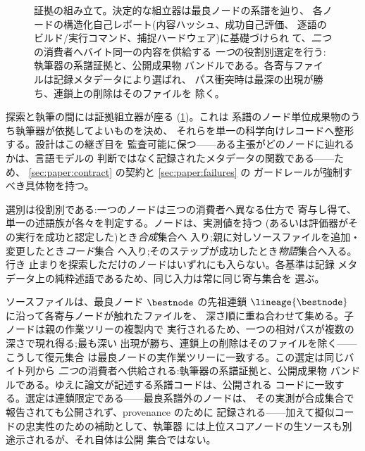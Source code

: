 \begin{figure}[t]
  \centering
  \resizebox{\columnwidth}{!}{}
  \caption{証拠の組み立て。決定的な組立器は最良ノードの系譜を辿り、
           各ノードの構造化自己レポート(内容ハッシュ、成功自己評価、
           逐語のビルド/実行コマンド、捕捉ハードウェア)に基礎づけられ
           て、\emph{二つ}の消費者へバイト同一の内容を供給する\emph{
           一つ}の役割別選定を行う:執筆器の系譜証拠と、公開成果物
           バンドルである。各寄与ファイルは記録メタデータにより選ばれ、
           パス衝突時は最深の出現が勝ち、連鎖上の削除はそのファイルを
           除く。}
  \label{fig:evidence}
\end{figure}

探索と執筆の間には証拠組立器が座る (\cref{fig:evidence})。これは
系譜のノード単位成果物のうち執筆器が依拠してよいものを決め、
それらを単一の科学向けレコードへ整形する。設計はこの継ぎ目を
監査可能に保つ——ある主張がどのノードに辿れるかは、言語モデルの
判断ではなく記録されたメタデータの関数である——ため、
\cref{sec:paper:contract} の契約と \cref{sec:paper:failures} の
ガードレールが強制すべき具体物を持つ。

選別は役割別である:一つのノードは三つの消費者へ異なる仕方で
寄与し得て、単一の述語族が各々を判定する。ノードは、実測値を持つ
(あるいは評価器がその実行を成功と認定した)とき\emph{合成}集合へ
入り;親に対しソースファイルを追加・変更したとき\emph{コード}集合
へ入り;そのステップが成功したとき\emph{物語}集合へ入る。行き
止まりを探索しただけのノードはいずれにも入らない。各基準は記録
メタデータ上の純粋述語であるため、同じ入力は常に同じ寄与集合を
選ぶ。

ソースファイルは、最良ノード $\bestnode$ の先祖連鎖
$\lineage{\bestnode}$ に沿って各寄与ノードが触れたファイルを、
深さ順に重ね合わせて集める。子ノードは親の作業ツリーの複製内で
実行されるため、一つの相対パスが複数の深さで現れ得る;最も深い
出現が勝ち、連鎖上の削除はそのファイルを除く——こうして復元集合
は最良ノードの実作業ツリーに一致する。この選定は同じバイト列から
\emph{二つ}の消費者へ供給される:執筆器の系譜証拠と、公開成果物
バンドルである。ゆえに論文が記述する系譜コードは、公開される
コードに一致する。選定は連鎖限定である——最良系譜外のノードは、
その実測が合成集合で報告されても公開されず、provenance のために
記録される——加えて擬似コードの忠実性のための補助として、執筆器
には上位スコアノードの生ソースも別途示されるが、それ自体は公開
集合ではない。

